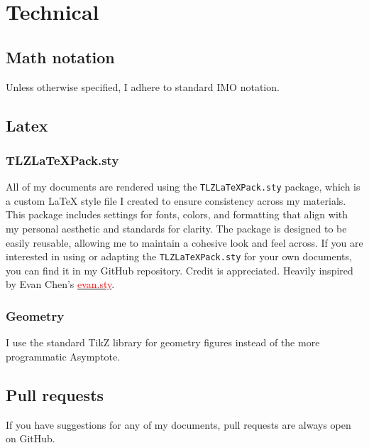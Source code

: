 \documentclass{article}
\begin{document}
\section{Technical}

\subsection{Math notation}
Unless otherwise specified, I adhere to standard IMO notation. 

\subsection{Latex}
\subsubsection{TLZLaTeXPack.sty}
All of my documents are rendered using the \texttt{TLZLaTeXPack.sty} package, which is a custom LaTeX style file I created to ensure consistency across my materials. This package includes settings for fonts, colors, and formatting that align with my personal aesthetic and standards for clarity.
The package is designed to be easily reusable, allowing me to maintain a cohesive look and feel across.
If you are interested in using or adapting the \texttt{TLZLaTeXPack.sty} for your own documents, you can find it in my GitHub repository. Credit is appreciated.
Heavily inspired by Evan Chen's \href{https://github.com/vEnhance/dotfiles/blob/main/texmf/tex/latex/evan/evan.sty}{\textcolor{red}{evan.sty}}.

\subsubsection{Geometry}
I use the standard TikZ library for geometry figures instead of the more programmatic Asymptote. 

\subsection{Pull requests}
If you have suggestions for any of my documents, pull requests are always open on GitHub.
\end{document}
